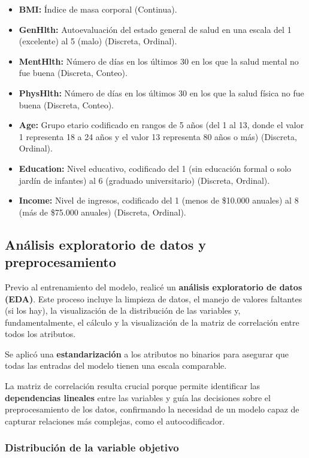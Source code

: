 \documentclass[a4paper,10pt]{book}
\begin{document}
\begin{itemize}
	\item \textbf{BMI:} Índice de masa corporal (Continua).
	\item \textbf{GenHlth:} Autoevaluación del estado general de salud en una escala del 1 (excelente) al 5 (malo) (Discreta, Ordinal).
	\item \textbf{MentHlth:} Número de días en los últimos 30 en los que la salud mental no fue buena (Discreta, Conteo).
	\item \textbf{PhysHlth:} Número de días en los últimos 30 en los que la salud física no fue buena (Discreta, Conteo).
	\item \textbf{Age:} Grupo etario codificado en rangos de 5 años (del 1 al 13, donde el valor 1 representa 18 a 24 años y el valor 13 representa 80 años o más) (Discreta, Ordinal).
	\item \textbf{Education:} Nivel educativo, codificado del 1 (sin educación formal o solo jardín de infantes) al 6 (graduado universitario) (Discreta, Ordinal).
	\item \textbf{Income:} Nivel de ingresos, codificado del 1 (menos de \$10.000 anuales) al 8 (más de \$75.000 anuales) (Discreta, Ordinal).
\end{itemize}

\subsection{Análisis exploratorio de datos y preprocesamiento}

Previo al entrenamiento del modelo, realicé un \textbf{análisis exploratorio de datos (EDA)}. Este proceso incluye la limpieza de datos, el manejo de valores faltantes (si los hay), la visualización de la distribución de las variables y, fundamentalmente, el cálculo y la visualización de la matriz de correlación entre todos los atributos.

Se aplicó una \textbf{estandarización} a los atributos no binarios para asegurar que todas las entradas del modelo tienen una escala comparable.

La matriz de correlación resulta crucial porque permite identificar las \textbf{dependencias lineales} entre las variables y guía las decisiones sobre el preprocesamiento de los datos, confirmando la necesidad de un modelo capaz de capturar relaciones más complejas, como el autocodificador.

\subsubsection{Distribución de la variable objetivo}
\end{document}
